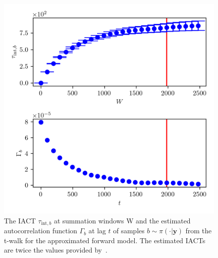 \begin{figure}[ht!]
	\centering
	\includegraphics{UwerrTauIntTWalk2.png}
	\caption[IACT and autocorrelation function of samples $b \sim \pi(\cdot|\bm{y})$, for approximated model.]{The IACT $\tau_{\text{int},b}$ at summation windows W and the estimated autocorrelation function $\Gamma_{b}$ at lag $t$ of samples $b \sim \pi( \cdot| \bm{y})$ from the t-walk for the approximated forward model.
	The estimated IACTs are twice the values provided by~\cite{drikHesse, UwerrM}.}
	\label{fig:TWalkIATC3}
\end{figure}


